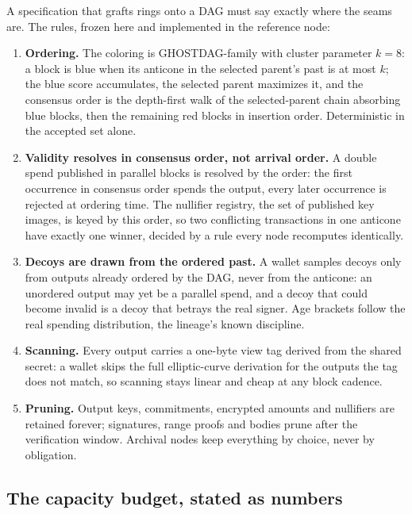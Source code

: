 A specification that grafts rings onto a DAG must say exactly where the
seams are. The rules, frozen here and implemented in the reference node:
\begin{enumerate}[leftmargin=1.7em, itemsep=3pt, topsep=4pt]
\item \textbf{Ordering.} The coloring is GHOSTDAG-family with cluster
parameter $k = 8$: a block is blue when its anticone in the selected
parent's past is at most $k$; the blue score accumulates, the selected
parent maximizes it, and the consensus order is the depth-first walk of the
selected-parent chain absorbing blue blocks, then the remaining red blocks
in insertion order. Deterministic in the accepted set alone.
\item \textbf{Validity resolves in consensus order, not arrival order.} A
double spend published in parallel blocks is resolved by the order: the
first occurrence in consensus order spends the output, every later
occurrence is rejected at ordering time. The nullifier registry, the set of
published key images, is keyed by this order, so two conflicting
transactions in one anticone have exactly one winner, decided by a rule
every node recomputes identically.
\item \textbf{Decoys are drawn from the ordered past.} A wallet samples
decoys only from outputs already ordered by the DAG, never from the
anticone: an unordered output may yet be a parallel spend, and a decoy that
could become invalid is a decoy that betrays the real signer. Age brackets
follow the real spending distribution, the lineage's known discipline.
\item \textbf{Scanning.} Every output carries a one-byte view tag derived
from the shared secret: a wallet skips the full elliptic-curve derivation
for the outputs the tag does not match, so scanning stays linear and cheap
at any block cadence.
\item \textbf{Pruning.} Output keys, commitments, encrypted amounts and
nullifiers are retained forever; signatures, range proofs and bodies prune
after the verification window. Archival nodes keep everything by choice,
never by obligation.
\end{enumerate}

\subsection{The capacity budget, stated as numbers}

